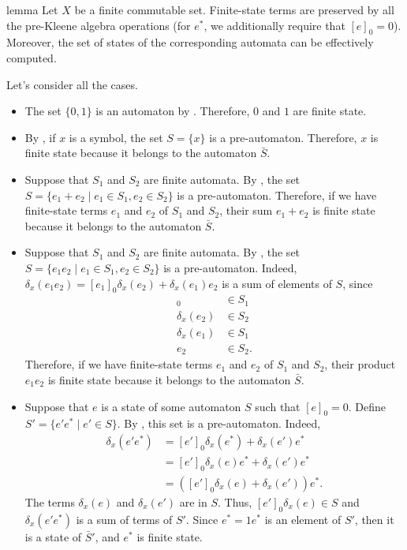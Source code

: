 \documentclass[a4paper,UKenglish,cleveref, autoref, thm-restate]{lipics-v2021}
\begin{document}
\begin{theoremEnd}{lemma}
  \label{lem:finite-state-closure}
  Let $X$ be a finite commutable set. Finite-state terms are preserved by all
  the pre-Kleene algebra operations (for $e^*$, we additionally require that
  $[e]_0 = 0$).  Moreover, the set of states of the corresponding automata can
  be effectively computed.
\end{theoremEnd}

\begin{proofEnd} %
  Let's consider all the cases.
  \begin{itemize}
  \item The set $\{0,1\}$ is an automaton by .
    Therefore, $0$ and $1$ are finite state.
  \item By , if $x$ is a symbol, the set $S = \{x\}$
    is a pre-automaton.  Therefore, $x$ is finite state because it belongs to
    the automaton $\bar{S}$.
  \item Suppose that $S_1$ and $S_2$ are finite automata.  By
    , the set
    $S = \{e_1 + e_2  \mid  e_1  \in  S_1, e_2  \in  S_2\}$ is a pre-automaton.  Therefore,
    if we have finite-state terms $e_1$ and $e_2$ of $S_1$ and $S_2$, their sum
    $e_1+e_2$ is finite state because it belongs to the automaton $\bar{S}$.
  \item Suppose that $S_1$ and $S_2$ are finite automata.  By
    , the set
    $S = \{e_1e_2 \mid  e_1  \in  S_1, e_2  \in  S_2\}$ is a pre-automaton.  Indeed,
    $ \delta _x(e_1e_2) = [e_1]_0 \delta _x(e_2) +  \delta _x(e_1)e_2$ is a sum of elements of $S$,
    since
    \begin{align*}
      [e_1]_0 &  \in  S_1 \\
       \delta _x(e_2) &  \in  S_2 \\
       \delta _x(e_1) &  \in  S_1 \\
      e_2 &  \in  S_2.
    \end{align*}
    Therefore, if we have finite-state terms $e_1$ and $e_2$ of $S_1$ and $S_2$,
    their product $e_1e_2$ is finite state because it belongs to the automaton
    $\bar{S}$.
  \item Suppose that $e$ is a state of some automaton $S$ such that $[e]_0 = 0$.
    Define $S' = \{ e'e^*  \mid  e'  \in  S \}$.  By , this
    set is a pre-automaton.  Indeed,
    \begin{align*}
       \delta _x(e'e^*)
      & = [e']_0 \delta _x(e^*) +  \delta _x(e')e^* \\
      & = [e']_0 \delta _x(e)e^* +  \delta _x(e')e^* \\
      & = ([e']_0 \delta _x(e)+ \delta _x(e'))e^*.
    \end{align*}
    The terms $ \delta _x(e)$ and $ \delta _x(e')$ are in $S$. Thus, $[e']_0 \delta _x(e)  \in  S$ and
    $ \delta _x(e'e^*)$ is a sum of terms of $S'$.  Since $e^* = 1e^*$ is an element of
    $S'$, then it is a state of $\bar{S}'$, and $e^*$ is finite state. \qedhere
  \end{itemize}
\end{proofEnd}
\end{document}

